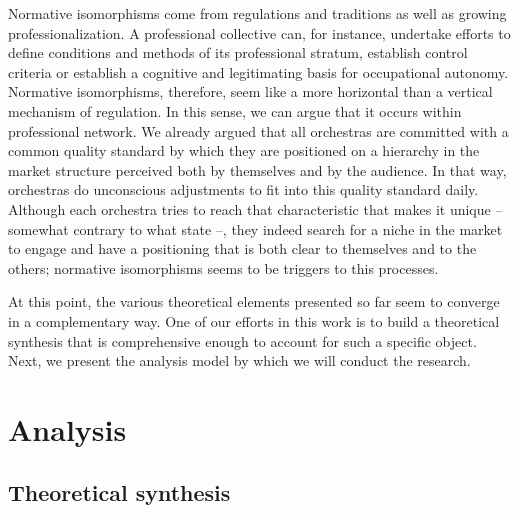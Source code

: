 \documentclass[a4paper, 12pt, openright, oneside, german, french, brazil, english, article]{abntex2}
\begin{document}
	Normative isomorphisms come from regulations and traditions as well as growing professionalization. A professional collective can, for instance, undertake efforts to define conditions and methods of its professional stratum, establish control criteria or establish a cognitive and legitimating basis for occupational autonomy. Normative isomorphisms, therefore, seem like a more horizontal than a vertical mechanism of regulation. In this sense, we can argue that it occurs within professional network. We already argued that all orchestras are committed with a common quality standard by which they are positioned on a hierarchy in the market structure perceived both by themselves and by the audience. In that way, orchestras do unconscious adjustments to fit into this quality standard daily. Although each orchestra tries to reach that characteristic that makes it unique -- somewhat contrary to what  state --, they indeed search for a niche in the market to engage and have a positioning that is both clear to themselves and to the others; normative isomorphisms seems to be triggers to this processes.
	
	
	
	At this point, the various theoretical elements presented so far seem to converge in a complementary way. One of our efforts in this work is to build a theoretical synthesis that is comprehensive enough to account for such a specific object. Next, we present the analysis model by which we will conduct the research.

	
	\section{Analysis}
	
	\subsection{Theoretical synthesis}
\end{document}
